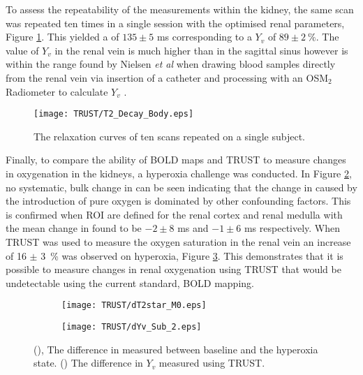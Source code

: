 To assess the repeatability of the measurements within the kidney, the same scan was repeated ten times in a single session with the optimised renal parameters, Figure \ref{fig:T2_Decay_Body}. This yielded a \ttwo of $135\pm5$ ms corresponding to a $Y_v$ of $89\pm2~\%$. The value of $Y_v$ in the renal vein is much higher than in the sagittal sinus however is within the range found by Nielsen \textit{et al} when drawing blood samples directly from the renal vein via insertion of a catheter and processing with an OSM$_2$ Radiometer to calculate $Y_v$ \cite{nielsen_renal_1992, saloojee_evaluation_1981}.

\begin{figure}[H]
	\centering
	\texttt{[image: TRUST/T2\_Decay\_Body.eps]}
	\caption{The \ttwo relaxation curves of ten scans repeated on a single subject.}
	\label{fig:T2_Decay_Body}	
\end{figure}

Finally, to compare the ability of \ac{BOLD} \ttwostar maps and \ac{TRUST} to measure changes in oxygenation in the kidneys, a hyperoxia challenge was conducted. In Figure \ref{fig:dT2star}, no systematic, bulk change in \ttwostar can be seen indicating that the change in \ttwostar caused by the introduction of pure oxygen is dominated by other confounding factors. This is confirmed when \ac{ROI} are defined for the renal cortex and renal medulla with the mean change in \ttwostar found to be $-2 \pm 8$ ms and $-1 \pm 6$ ms respectively. When \ac{TRUST} was used to measure the oxygen saturation in the renal vein an increase of 16 $\pm$ 3~\% was observed on hyperoxia, Figure \ref{fig:dYv}. This demonstrates that it is possible to measure changes in renal oxygenation using \ac{TRUST} that would be undetectable using the current standard, \ac{BOLD} \ttwostar mapping.
\begin{figure}[H]
	\centering
	\begin{subfigure}[c]{0.47\textwidth}
		\centering
		\texttt{[image: TRUST/dT2star\_M0.eps]}
		\caption{}
		\label{fig:dT2star}
	\end{subfigure}
	\hfill
	\begin{subfigure}[c]{0.47\textwidth}
		\centering
		\texttt{[image: TRUST/dYv\_Sub\_2.eps]}
		\caption{}
		\label{fig:dYv}
	\end{subfigure}
	\caption{(), The difference in \ttwostar measured between baseline and the hyperoxia state. () The difference in $Y_v$ measured using \ac{TRUST}.}
	\label{fig:oxygen_chalenge_results}
\end{figure}

